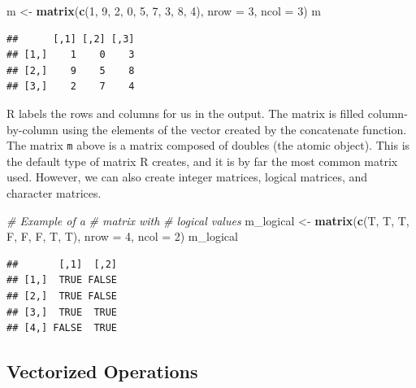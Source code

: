 \documentclass[
]{book}
\newenvironment{Shaded}{\begin{snugshade}}{\end{snugshade}}
\newcommand{\CommentTok}[1]{\textcolor[rgb]{0.56,0.35,0.01}{\textit{#1}}}
\newcommand{\DataTypeTok}[1]{\textcolor[rgb]{0.13,0.29,0.53}{#1}}
\newcommand{\DecValTok}[1]{\textcolor[rgb]{0.00,0.00,0.81}{#1}}
\newcommand{\KeywordTok}[1]{\textcolor[rgb]{0.13,0.29,0.53}{\textbf{#1}}}
\newcommand{\NormalTok}[1]{#1}
\newcommand{\StringTok}[1]{\textcolor[rgb]{0.31,0.60,0.02}{#1}}
\begin{document}
\begin{Shaded}
\begin{Highlighting}[]
\NormalTok{m <-}\StringTok{ }\KeywordTok{matrix}\NormalTok{(}\KeywordTok{c}\NormalTok{(}\DecValTok{1}\NormalTok{, }\DecValTok{9}\NormalTok{, }\DecValTok{2}\NormalTok{,}
    \DecValTok{0}\NormalTok{, }\DecValTok{5}\NormalTok{, }\DecValTok{7}\NormalTok{, }\DecValTok{3}\NormalTok{, }\DecValTok{8}\NormalTok{, }\DecValTok{4}\NormalTok{),}
    \DataTypeTok{nrow =} \DecValTok{3}\NormalTok{, }\DataTypeTok{ncol =} \DecValTok{3}\NormalTok{)}
\NormalTok{m}
\end{Highlighting}
\end{Shaded}

\begin{verbatim}
##      [,1] [,2] [,3]
## [1,]    1    0    3
## [2,]    9    5    8
## [3,]    2    7    4
\end{verbatim}

R labels the rows and columns for us in the output. The matrix is filled column-by-column using the elements of the vector created by the concatenate function. The matrix \texttt{m} above is a matrix composed of doubles (the atomic object). This is the default type of matrix R creates, and it is by far the most common matrix used. However, we can also create integer matrices, logical matrices, and character matrices.

\begin{Shaded}
\begin{Highlighting}[]
\CommentTok{# Example of a}
\CommentTok{# matrix with}
\CommentTok{# logical values}
\NormalTok{m_logical <-}\StringTok{ }\KeywordTok{matrix}\NormalTok{(}\KeywordTok{c}\NormalTok{(T,}
\NormalTok{    T, T, F, F, F, T,}
\NormalTok{    T), }\DataTypeTok{nrow =} \DecValTok{4}\NormalTok{, }\DataTypeTok{ncol =} \DecValTok{2}\NormalTok{)}
\NormalTok{m_logical}
\end{Highlighting}
\end{Shaded}

\begin{verbatim}
##       [,1]  [,2]
## [1,]  TRUE FALSE
## [2,]  TRUE FALSE
## [3,]  TRUE  TRUE
## [4,] FALSE  TRUE
\end{verbatim}

\hypertarget{vectorized-operations}{%
\subsection{Vectorized Operations}\label{vectorized-operations}}
\end{document}
